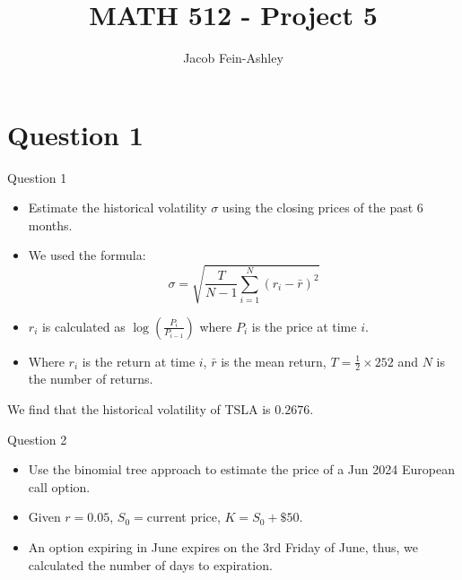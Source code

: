 \documentclass[compress,12pt]{beamer}
\title{MATH 512 - Project 5}
\subtitle{}
\date{}
\author{Jacob Fein-Ashley}
\begin{document}
\frame[plain]{\titlepage}

\section{Question 1}
\begin{frame}{Question 1}
      \begin{itemize}
            \item Estimate the historical volatility $\sigma$ using the closing prices of the past 6 months.
            \item We used the formula:
            \begin{equation*}
                  \sigma = \sqrt{\frac{T}{N-1} \sum_{i=1}^{N} (r_i - \bar{r})^2}
            \end{equation*}
            \item $r_i$ is calculated as $\log(\frac{P_{i}}{P_{i-1}})$ where $P_i$ is the price at time $i$.
            \item Where $r_i$ is the return at time $i$, $\bar{r}$ is the mean return, $T = \frac{1}{2} \times 252$ and $N$ is the number of returns.
      \end{itemize}

      \begin{tcolorbox}
            We find that the historical volatility of TSLA is $\boxed{0.2676}$.
      \end{tcolorbox}
\end{frame}


\begin{frame}{Question 2}
      \begin{itemize}
            \item Use the binomial tree approach to estimate the price of a Jun 2024 European call option.
            \item Given $r = 0.05$, $S_0 =  $current price, $K = S_0 + \$50$.
            \item An option expiring in June expires on the 3rd Friday of June, thus, we calculated
            the number of days to expiration.
      \end{itemize}

      
\end{frame}
\end{document}
